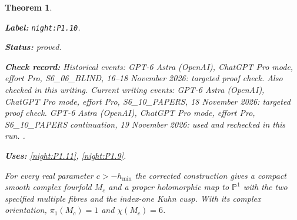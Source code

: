 \documentclass[11pt,a4paper]{article}
\newtheorem{theorem}{Theorem}[section]
\theoremstyle{definition}
\newcommand{\StatementRecord}[4]{\par\smallskip\begingroup\upshape\raggedright\noindent\textbf{Label:} \nolinkurl{#1}.\par\noindent\textbf{Status:} #2.\par\noindent\textbf{Check record:} #3.\par\noindent\textbf{Uses:} #4.\par\endgroup\smallskip}
\begin{document}
\begin{theorem}\label{night:P1.10}
\StatementRecord{night:P1.10}{proved}{Historical events: GPT-6 Astra (OpenAI), ChatGPT Pro mode, effort Pro, S6\_06\_BLIND, 16--18 November 2026: targeted proof check. Also checked in this writing. Current writing events: GPT-6 Astra (OpenAI), ChatGPT Pro mode, effort Pro, S6\_10\_PAPERS, 18 November 2026: targeted proof check. GPT-6 Astra (OpenAI), ChatGPT Pro mode, effort Pro, S6\_10\_PAPERS continuation, 19 November 2026: used and rechecked in this run. }{\cref{night:P1.11}, \cref{night:P1.9}}
For every real parameter $c>-h_{\min}$ the corrected construction gives
a compact smooth complex fourfold $M_c$ and a proper holomorphic map
to $\mathbb P^1$ with the two specified multiple fibres and the
index-one Kuhn cusp.  With its complex orientation,
$\pi_1(M_c)=1$ and $\chi(M_c)=6$.
\end{theorem}
\end{document}
